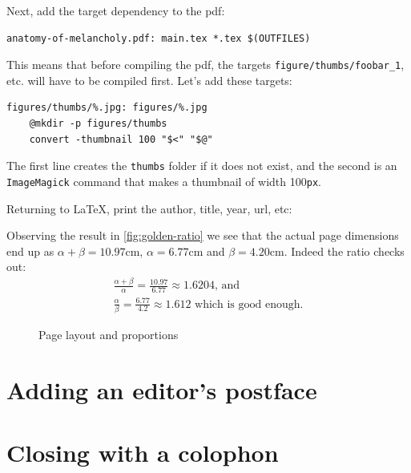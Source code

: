 \documentclass[12pt,a4,oneside,usenames,dvipsnames]{book}
\begin{document}
Next, add the target dependency to the pdf:

\begin{verbatim}
anatomy-of-melancholy.pdf: main.tex *.tex $(OUTFILES)
\end{verbatim}

This means that before compiling the pdf, the targets
\texttt{figure/thumbs/foobar\_1}, etc. will have to be compiled first.
Let's add these targets:

\begin{verbatim}
figures/thumbs/%.jpg: figures/%.jpg
    @mkdir -p figures/thumbs
    convert -thumbnail 100 "$<" "$@"
\end{verbatim}

The first line creates the \texttt{thumbs} folder if it does not exist,
and the second is an \texttt{ImageMagick} command that makes a thumbnail
of width 100\texttt{px}.

Returning to \LaTeX, print the author, title, year, url, etc:

\begin{figure}
{\centering%
%
\skelcaption[width=0.2\textwidth,lines=1]{}}
\end{figure}

Observing the result in \autoref{fig:golden-ratio} we see that the
actual page dimensions end up as $\alpha+\beta=10.97\textrm{cm}$,
$\alpha=6.77\textrm{cm}$ and $\beta=4.20\textrm{cm}$. Indeed the
ratio checks out:\\
\begin{gather*}
\frac{\alpha+\beta}{\alpha}=\frac{10.97}{6.77}\approx{}1.6204\text{, and}\\
\frac{\alpha}{\beta}=\frac{6.77}{4.2}\approx{}1.612\text{ which is good enough.}
\end{gather*}

\begin{figure}
\centering

\caption{Page layout and proportions\label{fig:golden-ratio}}
\end{figure}

\clearpage{}
\chapter{Adding an editor's postface}

\chapter{Closing with a colophon}

\end{document}
